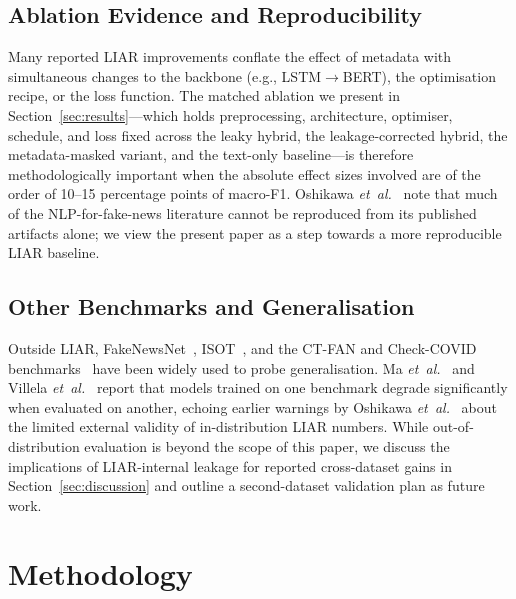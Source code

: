 \documentclass[journal]{IEEEtran}
\begin{document}
\subsection{Ablation Evidence and Reproducibility}
Many reported LIAR improvements conflate the effect of metadata with simultaneous changes to the backbone (e.g., LSTM$\rightarrow$BERT), the optimisation recipe, or the loss function. The matched ablation we present in Section~\ref{sec:results}---which holds preprocessing, architecture, optimiser, schedule, and loss fixed across the leaky hybrid, the leakage-corrected hybrid, the metadata-masked variant, and the text-only baseline---is therefore methodologically important when the absolute effect sizes involved are of the order of 10--15 percentage points of macro-F1. Oshikawa \emph{et~al.}~\cite{oshikawa2020} note that much of the NLP-for-fake-news literature cannot be reproduced from its published artifacts alone; we view the present paper as a step towards a more reproducible LIAR baseline.

\subsection{Other Benchmarks and Generalisation}
Outside LIAR, FakeNewsNet~\cite{shu2017}, ISOT~\cite{sadeghi2022}, and the CT-FAN and Check-COVID benchmarks~\cite{ma2024emnlp,abbas2023,gundapu2021} have been widely used to probe generalisation. Ma \emph{et~al.}~\cite{ma2024emnlp} and Villela \emph{et~al.}~\cite{villela2023} report that models trained on one benchmark degrade significantly when evaluated on another, echoing earlier warnings by Oshikawa \emph{et~al.}~\cite{oshikawa2020} about the limited external validity of in-distribution LIAR numbers. While out-of-distribution evaluation is beyond the scope of this paper, we discuss the implications of LIAR-internal leakage for reported cross-dataset gains in Section~\ref{sec:discussion} and outline a second-dataset validation plan as future work.

\section{Methodology}
\label{sec:method}
\end{document}
